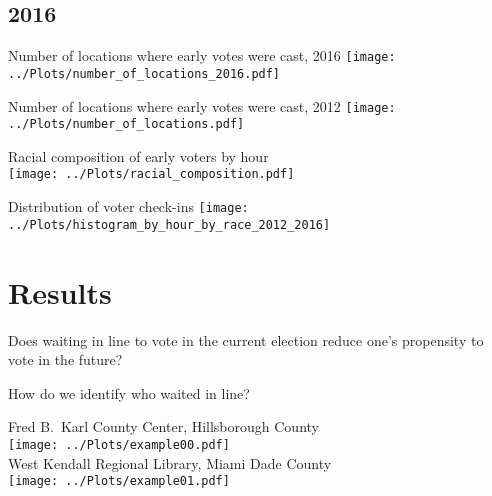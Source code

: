 \documentclass{beamer}
\begin{document}
		\subsection{2016}
		
		
		\begin{frame}				
		\end{frame}
		
		\begin{frame}				
		\centering 
		Number of locations where early votes were cast, 2016
		\texttt{[image: ../Plots/number\_of\_locations\_2016.pdf]}
		\end{frame}
		
		\begin{frame}				
		\centering 
		Number of locations where early votes were cast, 2012
		\texttt{[image: ../Plots/number\_of\_locations.pdf]}
		\end{frame}

		\begin{frame}			
			\centering 
			Racial composition of early voters by hour	\\
			\texttt{[image: ../Plots/racial\_composition.pdf]}
		\end{frame}

		\begin{frame}				
			\centering 
			Distribution of voter check-ins
		\texttt{[image: ../Plots/histogram\_by\_hour\_by\_race\_2012\_2016]}
		\end{frame}


                \section{Results}
	
		\begin{frame}
		Does waiting in line to vote in the current election reduce one's propensity to vote in the future?
		\end{frame}

		\begin{frame}
                  How do we identify who waited in line?
		\end{frame}
 
		\begin{frame}				
			\centering 
			Fred B.\ Karl County Center, Hillsborough County\\
			\texttt{[image: ../Plots/example00.pdf]} \\
			West Kendall Regional Library, Miami Dade County\\
			\texttt{[image: ../Plots/example01.pdf]} \\ 
		\end{frame}
\end{document}
